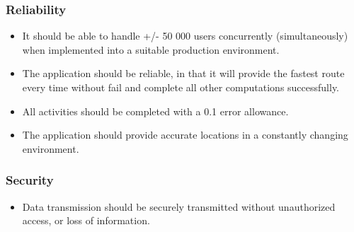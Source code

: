 \documentclass{article}
\begin{document}
			\subsubsection{Reliability} 
			\begin{itemize}
			\item It should be able to handle +/- 50 000 users concurrently (simultaneously) when implemented into a suitable production environment. 
			\item The application should be reliable, in that it will provide the fastest route every time without fail and complete all other computations successfully. 
			\item All activities should be completed with a 0.1 error allowance.
			\item The application should provide accurate locations in a constantly changing environment.\\
			\end{itemize}
			\subsubsection{Security}
			\begin{itemize}
			\item Data transmission should be securely transmitted without unauthorized access, or loss of information.\\
			\end{itemize}

	
	
\end{document}
